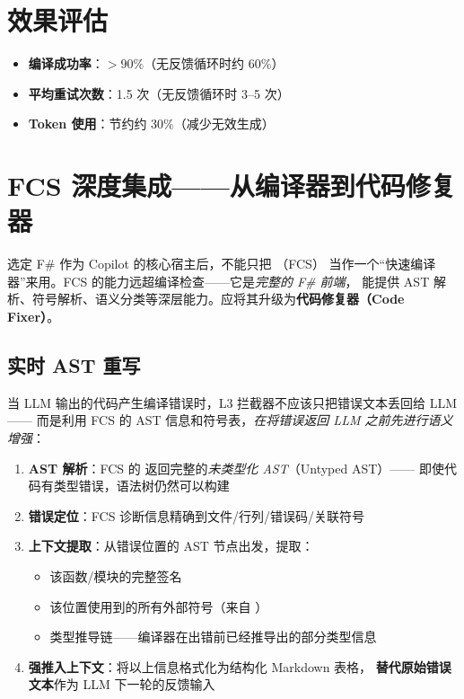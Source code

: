 \documentclass[10pt, openany]{book}
\begin{document}
\section{效果评估}

\begin{itemize}
    \item \textbf{编译成功率}：\(>90\%\)（无反馈循环时约 60\%）~\cite{Chen2021Codex}
    \item \textbf{平均重试次数}：1.5 次（无反馈循环时 3--5 次）
    \item \textbf{Token 使用}：节约约 30\%（减少无效生成）
\end{itemize}

\section{FCS 深度集成——从编译器到代码修复器}

选定 F\# 作为 Copilot 的核心宿主后，不能只把 （FCS）
当作一个``快速编译器''来用。FCS 的能力远超编译检查——它是\emph{完整的 F\# 前端}，
能提供 AST 解析、符号解析、语义分类等深层能力。应将其升级为\textbf{代码修复器（Code Fixer）}。

\subsection{实时 AST 重写}

当 LLM 输出的代码产生编译错误时，L3 拦截器不应该只把错误文本丢回给 LLM——
而是利用 FCS 的 AST 信息和符号表，\emph{在将错误返回 LLM 之前先进行语义增强}：

\begin{enumerate}
    \item \textbf{AST 解析}：FCS 的  返回完整的\emph{未类型化 AST}（Untyped AST）——
        即使代码有类型错误，语法树仍然可以构建
    \item \textbf{错误定位}：FCS 诊断信息精确到文件/行列/错误码/关联符号
    \item \textbf{上下文提取}：从错误位置的 AST 节点出发，提取：
        \begin{itemize}
            \item 该函数/模块的完整签名
            \item 该位置使用到的所有外部符号（来自 ）
            \item 类型推导链——编译器在出错前已经推导出的部分类型信息
        \end{itemize}
    \item \textbf{强推入上下文}：将以上信息格式化为结构化 Markdown 表格，
        \textbf{替代原始错误文本}作为 LLM 下一轮的反馈输入
\end{enumerate}
\end{document}
